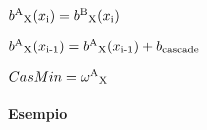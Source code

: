 \documentclass{report}
\newcommand{\myparagraph}[1]{\paragraph{#1}\mbox{} \mbox{}}
\begin{document}
\begin{center}
{\begin{minipage}{18em}
\begin{algorithmic}
				\State $b\textsuperscript{A}\textsubscript{X}(x\textsubscript{i})=b\textsuperscript{B}\textsubscript{X}(x\textsubscript{i})$
	
			\EndIf
	
			\State $b\textsuperscript{A}\textsubscript{X}(x\textsubscript{i-1})=b\textsuperscript{A}\textsubscript{X}(x\textsubscript{i-1}) + b\textsubscript{cascade}$
	
		\EndFor
	
		\State $CasMin=\omega\textsuperscript{A}\textsubscript{X}$
	\end{algorithmic}
	\end{minipage}}
	\end{center}
	
	\hypertarget{header-n158}{%
		\myparagraph{Esempio}\label{header-n158}}
	
\end{document}
